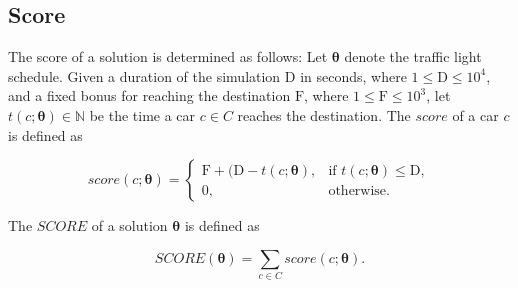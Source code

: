 \newpage

\subsection{Score}

The score of a solution is determined as follows: Let $\bm{\theta}$ denote the traffic light schedule. Given a duration of the simulation $\mathrm{D}$ in seconds, where $1 \leq \mathrm{D} \leq 10^4$, and a fixed bonus for reaching the destination $\mathrm{F}$, where $1 \leq \mathrm{F} \leq 10^3$, let $t(c; \bm{\theta}) \in \mathbb{N}$ be the time a car $c \in C$ reaches the destination. The $score$ of a car $c$ is defined as

\begin{equation}
    score(c; \bm{\theta}) =
    \begin{cases}
        \mathrm{F} + (\mathrm{D} - t(c; \bm{\theta}), & \text{if $t(c; \bm{\theta}) \leq \mathrm{D}$}, \\
        0, & \text{otherwise}.
    \end{cases}
\end{equation}

The $SCORE$ of a solution $\bm{\theta}$ is defined as

\begin{equation}
    SCORE(\bm{\theta}) = \sum_{c \in C} score(c; \bm{\theta}).
\end{equation}
